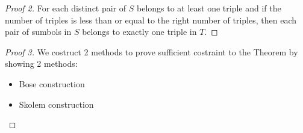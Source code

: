 \begin{frame}
\begin{proof}[Proof 2]
	For each distinct pair of $S$ belongs to at least one triple and if the number of triples is less than or equal to the right number of triples, then each pair of sumbols in $S$ belongs to exactly one triple in $T$.
\end{proof}

\begin{proof}[Proof 3]
	We costruct 2 methods to prove sufficient costraint to the Theorem by showing 2 methods:
	\begin{itemize}
		\item Bose construction
		\item Skolem construction
	\end{itemize}
\end{proof}
\end{frame}
